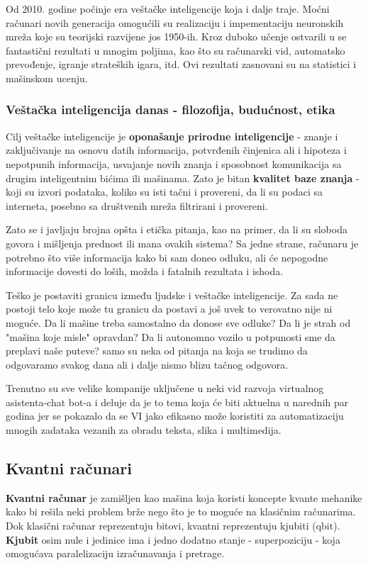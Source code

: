 \documentclass[a4paper]{article}
\begin{document}
{Od 2010. godine počinje era veštačke inteligencije koja i dalje traje. Moćni računari novih generacija omogućili su realizaciju i impementaciju neuronskih mreža koje su teorijski razvijene jos 1950-ih.
Kroz duboko učenje ostvarili u se fantastični rezultati u mnogim poljima, kao što su računarski vid, automatsko prevođenje, igranje strateških igara, itd. Ovi rezultati zasnovani su na statistici i mašinskom ucenju.

\subsubsection{Veštačka inteligencija danas - filozofija, budućnost, etika}
Cilj veštačke inteligencije je {\bf oponašanje prirodne inteligencije } - znanje i zaključivanje na osnovu datih informacija, potvrđenih činjenica ali i hipoteza  i nepotpunih informacija, usvajanje novih znanja i sposobnost komunikacija sa drugim inteligentnim bićima ili mašinama. Zato je bitan { \bf kvalitet baze znanja } - koji su izvori podataka, koliko su isti tačni i provereni, da li su podaci sa interneta, posebno sa društvenih mreža filtrirani i provereni.

Zato se i javljaju brojna opšta i etička pitanja, kao na primer, da li su sloboda govora i mišljenja prednost ili mana ovakih sistema? 
Sa jedne strane, računaru je potrebno što više informacija kako bi sam doneo odluku, ali će nepogodne informacije dovesti do loših, možda i fatalnih rezultata i ishoda. 

Teško je postaviti granicu između ljudske i veštačke inteligencije. Za sada ne postoji telo koje može tu granicu da postavi a još uvek to verovatno nije ni moguće. Da li mašine treba samostalno da donose sve odluke?  Da li je strah od "mašina koje misle" opravdan? Da li autonomno vozilo u potpunosti sme da preplavi naše puteve? samo su neka od pitanja na koja se trudimo da odgovaramo svakog dana ali i dalje nismo blizu tačnog odgovora.

Trenutno su sve velike kompanije uključene u neki vid razvoja virtualnog asistenta-chat bot-a i deluje da je to tema koja će biti aktuelna u narednih par godina jer se pokazalo da se VI jako efikasno može koristiti za automatizaciju mnogih zadataka vezanih za obradu teksta, slika i multimedija. 


\setlength{\parskip}{1em}


\subsection{Kvantni računari}	
{\bf Kvantni računar} je zamišljen kao mašina koja koristi koncepte kvante mehanike kako bi rešila neki problem brže nego što je to moguće na klasičnim računarima. Dok klasični računar reprezentuju bitovi, kvantni
reprezentuju kjubiti (qbit). {\bf Kjubit} osim nule i jedinice ima i jedno dodatno stanje - superpoziciju - koja omogućava paralelizaciju
izračunavanja i pretrage. \cite{kvantni}

}
\end{document}
